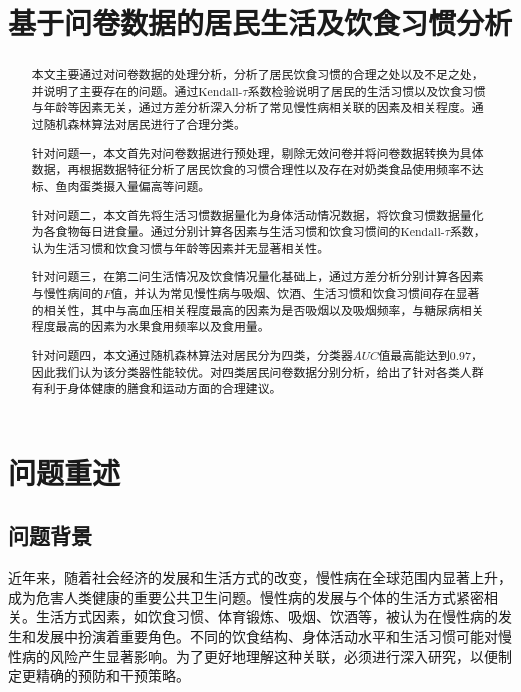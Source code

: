 \documentclass{cumcmthesis}
\title{基于问卷数据的居民生活及饮食习惯分析}
\begin{document}
 \maketitle
 \begin{abstract}
本文主要通过对问卷数据的处理分析，分析了居民饮食习惯的合理之处以及不足之处，并说明了主要存在的问题。通过$\text{Kendall-}\tau$系数检验说明了居民的生活习惯以及饮食习惯与年龄等因素无关，通过方差分析深入分析了常见慢性病相关联的因素及相关程度。通过随机森林算法对居民进行了合理分类。

针对问题一，本文首先对问卷数据进行预处理，剔除无效问卷并将问卷数据转换为具体数据，再根据数据特征分析了居民饮食的习惯合理性以及存在对奶类食品使用频率不达标、鱼肉蛋类摄入量偏高等问题。

针对问题二，本文首先将生活习惯数据量化为身体活动情况数据，将饮食习惯数据量化为各食物每日进食量。通过分别计算各因素与生活习惯和饮食习惯间的$\text{Kendall-}\tau$系数，认为生活习惯和饮食习惯与年龄等因素并无显著相关性。

针对问题三，在第二问生活情况及饮食情况量化基础上，通过方差分析分别计算各因素与慢性病间的$F$值，并认为常见慢性病与吸烟、饮酒、生活习惯和饮食习惯间存在显著的相关性，其中与高血压相关程度最高的因素为是否吸烟以及吸烟频率，与糖尿病相关程度最高的因素为水果食用频率以及食用量。

针对问题四，本文通过随机森林算法对居民分为四类，分类器$AUC$值最高能达到0.97，因此我们认为该分类器性能较优。对四类居民问卷数据分别分析，给出了针对各类人群有利于身体健康的膳食和运动方面的合理建议。

\end{abstract}

\tableofcontents

















\clearpage
\section{问题重述}
\subsection{问题背景}
近年来，随着社会经济的发展和生活方式的改变，慢性病在全球范围内显著上升，成为危害人类健康的重要公共卫生问题。慢性病的发展与个体的生活方式紧密相关。生活方式因素，如饮食习惯、体育锻炼、吸烟、饮酒等，被认为在慢性病的发生和发展中扮演着重要角色。不同的饮食结构、身体活动水平和生活习惯可能对慢性病的风险产生显著影响。为了更好地理解这种关联，必须进行深入研究，以便制定更精确的预防和干预策略。
\end{document}

